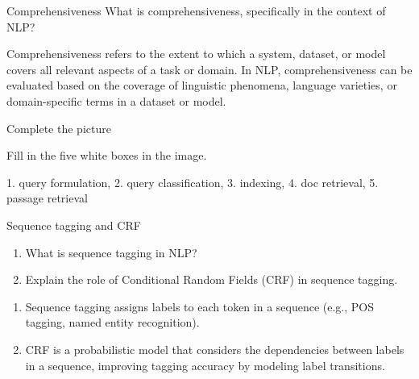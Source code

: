 \documentclass{article}
\begin{document}
\setcounter{section}{2020}

\begin{exercise}{Comprehensiveness}
  What is comprehensiveness, specifically in the context of NLP?

  \begin{solution}
    Comprehensiveness refers to the extent to which a system, dataset, or model covers all relevant aspects of a task or domain.
    In NLP, comprehensiveness can be evaluated based on the coverage of linguistic phenomena, language varieties, or domain-specific terms in a dataset or model.
  \end{solution}
\end{exercise}

\begin{exercise}{Complete the picture}
  

  Fill in the five white boxes in the image.

  \begin{solution}
    1. query formulation, 2. query classification, 3. indexing, 4. doc retrieval, 5. passage retrieval
  \end{solution}
\end{exercise}

\begin{exercise}{Sequence tagging and CRF}\label{ex:seq-tagging}
  \begin{enumerate}
    \item What is sequence tagging in NLP?
    \item Explain the role of Conditional Random Fields (CRF) in sequence tagging.
  \end{enumerate}

  \begin{solution}
    \begin{enumerate}
        \item Sequence tagging assigns labels to each token in a sequence (e.g., POS tagging, named entity recognition).
        \item CRF is a probabilistic model that considers the dependencies between labels in a sequence, improving tagging accuracy by modeling label transitions.
    \end{enumerate}
  \end{solution}
\end{exercise}
\end{document}

